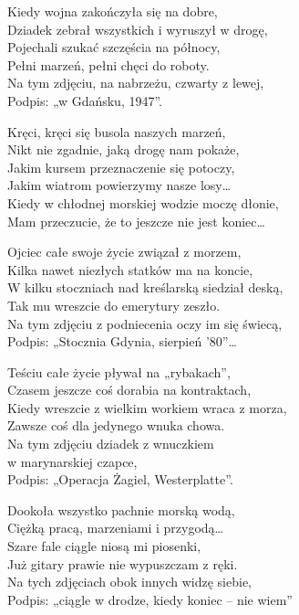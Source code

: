 \begin{text}
    Kiedy wojna zakończyła się na dobre,\\
    Dziadek zebrał wszystkich i wyruszył w drogę,\\
    Pojechali szukać szczęścia na północy,\\
    Pełni marzeń, pełni chęci do roboty.\\
    Na tym zdjęciu, na nabrzeżu, czwarty z lewej,\\
    Podpis: „w Gdańsku, 1947”.

    Kręci, kręci się busola naszych marzeń,\\
    Nikt nie zgadnie, jaką drogę nam pokaże,\\
    Jakim kursem przeznaczenie się potoczy,\\
    Jakim wiatrom powierzymy nasze losy…\\
    Kiedy w chłodnej morskiej wodzie moczę dłonie,\\
    Mam przeczucie, że to jeszcze nie jest koniec…

    Ojciec całe swoje życie związał z morzem,\\
    Kilka nawet niezłych statków ma na koncie,\\
    W kilku stoczniach nad kreślarską siedział deską,\\
    Tak mu wreszcie do emerytury zeszło.\\
    Na tym zdjęciu z podniecenia oczy im się świecą,\\
    Podpis: „Stocznia Gdynia, sierpień '80”…

    Teściu całe życie pływał na „rybakach”,\\
    Czasem jeszcze coś dorabia na kontraktach,\\
    Kiedy wreszcie z wielkim workiem wraca z morza,\\
    Zawsze coś dla jedynego wnuka chowa.\\
    Na tym zdjęciu dziadek z wnuczkiem\\
    \vin \vin \vin w marynarskiej czapce,\\
    Podpis: „Operacja Żagiel, Westerplatte”.

    Dookoła wszystko pachnie morską wodą,\\
    Ciężką pracą, marzeniami i przygodą…\\
    Szare fale ciągle niosą mi piosenki,\\
    Już gitary prawie nie wypuszczam z ręki.\\
    Na tych zdjęciach obok innych widzę siebie,\\
    Podpis: „ciągle w drodze, kiedy koniec – nie wiem”
\end{text}
